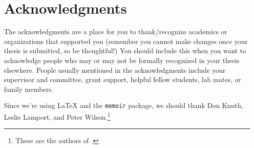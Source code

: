 \chapter{Acknowledgments}

The acknowledgments are a place for you to thank/recognize academics
or organizations that supported you (remember you cannot make changes
once your thesis is submitted, so be thoughtful!)  You should include
this when you want to acknowledge people who may or may not be
formally recognized in your thesis elsewhere.  People usually
mentioned in the acknowledgments include your supervisor and
committee, grant support, helpful fellow students, lab mates, or
family members.

Since we're using \LaTeX{} and the \verb|memoir| package, we should
thank Don Knuth, Leslie Lamport, and Peter Wilson.\footnote{These are
the authors of \citet{Knuth1986,Lamport1986,Wilson2016}.}

\dedication{To mom.}

\tableofcontents


\listoftables


\listoffigures

